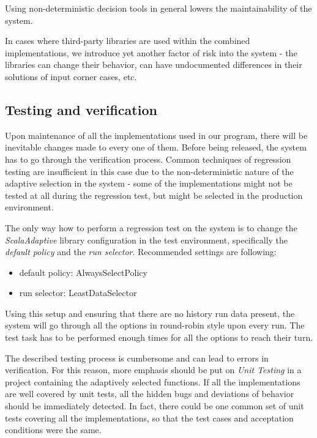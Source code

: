 Using non-deterministic decision tools in general lowers the maintainability of the system.

In cases where third-party libraries are used within the combined implementations, we introduce yet another factor of risk into the system - the libraries can change their behavior, can have undocumented differences in their solutions of input corner cases, etc.

\subsection{Testing and verification}

Upon maintenance of all the implementations used in our program, there will be inevitable changes made to every one of them. Before being released, the system has to go through the verification process. Common techniques of regression testing are insufficient in this case due to the non-deterministic nature of the adaptive selection in the system - some of the implementations might not be tested at all during the regression test, but might be selected in the production environment.

The only way how to perform a regression test on the system is to change the \textit{ScalaAdaptive} library configuration in the test environment, specifically the \textit{default policy} and the \textit{run selector}. Recommended settings are following:

 \begin{itemize}
 	\item default policy: AlwaysSelectPolicy
 	\item run selector: LeastDataSelector
 \end{itemize}

Using this setup and ensuring that there are no history run data present, the system will go through all the options in round-robin style upon every run. The test task has to be performed enough times for all the options to reach their turn.

The described testing process is cumbersome and can lead to errors in verification. For this reason, more emphasis should be put on \textit{Unit Testing} in a project containing the adaptively selected functions. If all the implementations are well covered by unit tests, all the hidden bugs and deviations of behavior should be immediately detected. In fact, there could be one common set of unit tests covering all the implementations, so that the test cases and acceptation conditions were the same.

